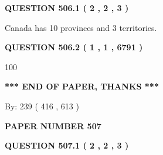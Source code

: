 \documentclass[12pt]{article}
\begin{document}
   
  
\vspace{0.2in}
  
{\textbf{\Large{QUESTION
506.1 
 ( 2 , 2 , 3 )
}}}
  
  
 
 
\noindent{}
 
 
Canada has 10  provinces and 3 territories.
 
 
 
 
  
\vspace{0.2in}
  
{\textbf{\Large{QUESTION
506.2 
 ( 1 , 1 , 6791 )
}}}
  
  
 
 
\noindent{}

100
 
 
   
   
 \vspace{0.2in}
 
   
   
   
   
\vspace{1.0in} 
{\textbf{\large{ *** END OF PAPER, THANKS *** }}} 
   
   
\hspace{1.0in} By: 
 239 ( 416 ,  613 )
   
   
   
   
\newpage 
\setcounter{page}{ 
   507001 } 
   
   
   
   
 {\textbf{ \Large{ PAPER NUMBER  507  }}}
   
   
\vspace{0.2in}
   
   
   
   
   
   
 \vspace{0.2in}
 
 
 
 
   
   
  
\vspace{0.2in}
  
{\textbf{\Large{QUESTION
507.1 
 ( 2 , 2 , 3 )
}}}
  
\end{document}
